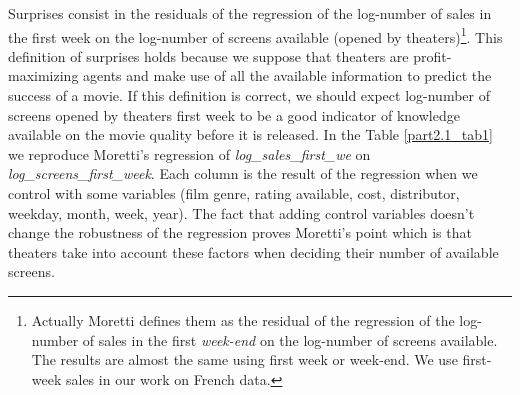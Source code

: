 Surprises consist in the residuals of the regression of the log-number of sales in the first week on the log-number of screens available (opened by theaters)\footnote{Actually Moretti defines them as the residual of the regression of the log-number of sales in the first \textit{week-end} on the log-number of screens available. The results are almost the same using first week or week-end. We use first-week sales in our work on French data.}.
This definition of surprises holds because we suppose that theaters are profit-maximizing agents and make use of all the available information to predict the success of a movie. If this definition is correct, we should expect log-number of screens opened by theaters first week to be a good indicator of knowledge available on the movie quality before it is released. In the Table \ref{part2.1_tab1} we reproduce Moretti's regression of \textit{log\_sales\_first\_we} on \textit{log\_screens\_first\_week}. Each column is the result of the regression when we control with some variables (film genre, rating available, cost, distributor, weekday, month, week, year). The fact that adding control variables doesn't change the robustness of the regression proves Moretti's point which is that theaters take into account these factors when deciding their number of available screens. 

